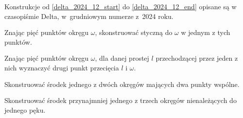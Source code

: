 %

Konstrukcje od \ref{delta_2024_12_start} do \ref{delta_2024_12_end} opisane są w czasopiśmie Delta, w~grudniowym numerze z~2024 roku.

\begin{geoconstruction}
    \label{delta_2024_12_start}
    Znając pięć punktów okręgu $\omega$, skonstruować styczną do $\omega$ w jednym z tych punktów.
\end{geoconstruction}

\begin{geoconstruction}
    Znając pięć punktów okręgu $\omega$, dla danej prostej $l$ przechodzącej przez jeden z nich wyznaczyć drugi punkt przecięcia $l$ i $\omega$.
\end{geoconstruction}

\begin{geoconstruction}
    Skonstruować środek jednego z dwóch okręgów mających dwa punkty wspólne.
\end{geoconstruction}

\begin{geoconstruction}
    \label{delta_2024_12_end}
    Skonstruować środek przynajmniej jednego z trzech okręgów nienależących do jednego pęku.
\end{geoconstruction}

%